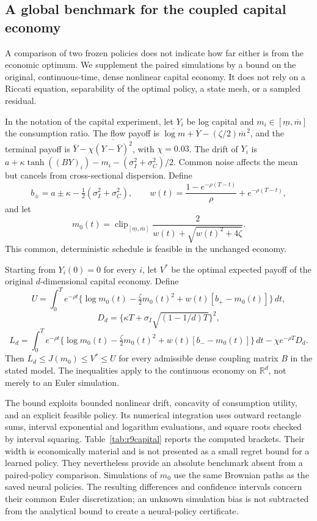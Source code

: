 \subsection{A global benchmark for the coupled capital economy}\label{sec:r9capital}
A comparison of two frozen policies does not indicate how far either is from the economic optimum. We supplement the paired simulations by a bound on the original, continuous-time, dense nonlinear capital economy. It does not rely on a Riccati equation, separability of the optimal policy, a state mesh, or a sampled residual.

In the notation of the capital experiment, let $Y_i$ be log capital and $m_i\in[\underline m,\overline m]$ the consumption ratio. The flow payoff is $\overline{\log m}+\overline Y-(\zeta/2)\overline m^{\,2}$, and the terminal payoff is $\overline Y-\chi\overline{(Y-\overline Y)^2}$, with $\chi=0.03$. The drift of $Y_i$ is $a+\kappa\tanh((BY)_i)-m_i-(\sigma_I^2+\sigma_C^2)/2$. Common noise affects the mean but cancels from cross-sectional dispersion. Define
\[
 b_\pm=a\pm\kappa-\tfrac12(\sigma_I^2+\sigma_C^2),\qquad
 w(t)=\frac{1-e^{-\rho(T-t)}}{\rho}+e^{-\rho(T-t)},
\]
and let
\[
 m_0(t)=\operatorname{clip}_{[\underline m,\overline m]}
 \frac{2}{w(t)+\sqrt{w(t)^2+4\zeta}}.
\]
This common, deterministic schedule is feasible in the unchanged economy.

\begin{proposition}\label{prop:r9capital}
Starting from $Y_i(0)=0$ for every $i$, let $V^*$ be the optimal expected payoff of the original $d$-dimensional capital economy. Define
\[
 U=\int_0^T e^{-\rho t}\{\log m_0(t)-\tfrac{\zeta}{2}m_0(t)^2+w(t)[b_+-m_0(t)]\}\,dt,
\]
\[
 D_d=\{\kappa T+\sigma_I\sqrt{(1-1/d)T}\}^{2},
\]
\[
 L_d=\int_0^T e^{-\rho t}\{\log m_0(t)-\tfrac{\zeta}{2}m_0(t)^2+w(t)[b_--m_0(t)]\}\,dt
 -\chi e^{-\rho T}D_d.
\]
Then $L_d\leq J(m_0)\leq V^*\leq U$ for every admissible dense coupling matrix $B$ in the stated model. The inequalities apply to the continuous economy on $\mathbb R^d$, not merely to an Euler simulation.
\end{proposition}

The bound exploits bounded nonlinear drift, concavity of consumption utility, and an explicit feasible policy. Its numerical integration uses outward rectangle sums, interval exponential and logarithm evaluations, and square roots checked by interval squaring. Table~\ref{tab:r9capital} reports the computed brackets. Their width is economically material and is not presented as a small regret bound for a learned policy. They nevertheless provide an absolute benchmark absent from a paired-policy comparison. Simulations of $m_0$ use the same Brownian paths as the saved neural policies. The resulting differences and confidence intervals concern their common Euler discretization; an unknown simulation bias is not subtracted from the analytical bound to create a neural-policy certificate.

